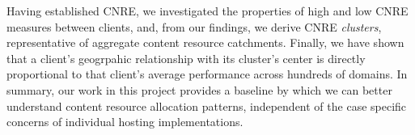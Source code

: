 Having established CNRE, we investigated the properties of high and low CNRE
measures between clients, and, from our findings, we derive CNRE \emph{clusters},
representative of aggregate content resource catchments. Finally, we have shown that a
client's geogrpahic relationship with its cluster's center is directly
proportional to that client's average performance across hundreds of domains. In
summary, our work in this project provides a baseline by which we can better
understand content resource allocation patterns, independent of the case specific
concerns of individual hosting implementations.
